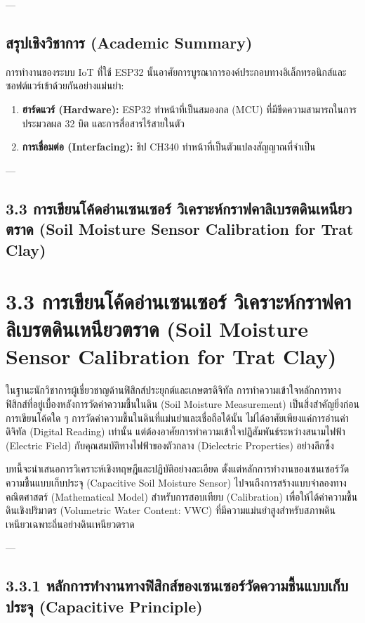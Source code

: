 \documentclass[11pt,a4paper,openany]{report}
\begin{document}
---

\section{สรุปเชิงวิชาการ (Academic Summary)}


การทำงานของระบบ IoT ที่ใช้ ESP32 นั้นอาศัยการบูรณาการองค์ประกอบทางอิเล็กทรอนิกส์และซอฟต์แวร์เข้าด้วยกันอย่างแม่นยำ:

\begin{enumerate}
  \item \textbf{ฮาร์ดแวร์ (Hardware):} ESP32 ทำหน้าที่เป็นสมองกล (MCU) ที่มีขีดความสามารถในการประมวลผล 32 บิต และการสื่อสารไร้สายในตัว
  \item \textbf{การเชื่อมต่อ (Interfacing):} ชิป CH340 ทำหน้าที่เป็นตัวแปลงสัญญาณที่จำเป็น
\end{enumerate}



---

\section{3.3 การเขียนโค้ดอ่านเซนเซอร์ วิเคราะห์กราฟคาลิเบรตดินเหนียวตราด (Soil Moisture Sensor Calibration for Trat Clay)}


\chapter{3.3 การเขียนโค้ดอ่านเซนเซอร์ วิเคราะห์กราฟคาลิเบรตดินเหนียวตราด (Soil Moisture Sensor Calibration for Trat Clay)}


ในฐานะนักวิชาการผู้เชี่ยวชาญด้านฟิสิกส์ประยุกต์และเกษตรดิจิทัล การทำความเข้าใจหลักการทางฟิสิกส์ที่อยู่เบื้องหลังการวัดค่าความชื้นในดิน (Soil Moisture Measurement) เป็นสิ่งสำคัญยิ่งก่อนการเขียนโค้ดใด ๆ การวัดค่าความชื้นในดินที่แม่นยำและเชื่อถือได้นั้น ไม่ได้อาศัยเพียงแค่การอ่านค่าดิจิทัล (Digital Reading) เท่านั้น แต่ต้องอาศัยการทำความเข้าใจปฏิสัมพันธ์ระหว่างสนามไฟฟ้า (Electric Field) กับคุณสมบัติทางไฟฟ้าของตัวกลาง (Dielectric Properties) อย่างลึกซึ้ง

บทนี้จะนำเสนอการวิเคราะห์เชิงทฤษฎีและปฏิบัติอย่างละเอียด ตั้งแต่หลักการทำงานของเซนเซอร์วัดความชื้นแบบเก็บประจุ (Capacitive Soil Moisture Sensor) ไปจนถึงการสร้างแบบจำลองทางคณิตศาสตร์ (Mathematical Model) สำหรับการสอบเทียบ (Calibration) เพื่อให้ได้ค่าความชื้นดินเชิงปริมาตร (Volumetric Water Content: VWC) ที่มีความแม่นยำสูงสำหรับสภาพดินเหนียวเฉพาะถิ่นอย่างดินเหนียวตราด

---

\section{3.3.1 หลักการทำงานทางฟิสิกส์ของเซนเซอร์วัดความชื้นแบบเก็บประจุ (Capacitive Principle)}
\end{document}
